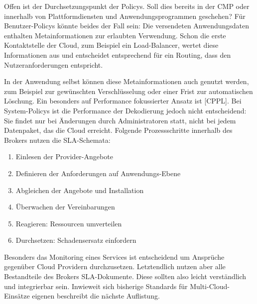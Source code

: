 Offen ist der Durchsetzungspunkt der Policys. Soll dies bereits in der CMP oder innerhalb von Plattformdiensten und Anwendungsprogrammen geschehen? Für Benutzer-Policys könnte beides der Fall sein: Die versendeten Anwendungsdaten enthalten Metainformationen zur erlaubten Verwendung. Schon die erste Kontaktstelle der Cloud, zum Beispiel ein Load-Balancer, wertet diese Informationen aus und entscheidet entsprechend für ein Routing, dass den Nutzeranforderungen entspricht. 

In der Anwendung selbst können diese Metainformationen auch genutzt werden, zum Beispiel zur gewünschten Verschlüsselung oder einer Frist zur automatischen Löschung. Ein besonders auf Performance fokussierter Ansatz ist [CPPL]. Bei System-Policys ist die Performance der Dekodierung jedoch nicht entscheidend: Sie findet nur bei Änderungen durch Administratoren statt, nicht bei jedem Datenpaket, das die Cloud erreicht. Folgende Prozessschritte innerhalb des Brokers nutzen die SLA-Schemata:

\begin{enumerate}
	\item Einlesen der Provider-Angebote
	\item Definieren der Anforderungen auf Anwendungs-Ebene
	\item Abgleichen der Angebote und Installation
	\item Überwachen der Vereinbarungen
	\item Reagieren: Ressourcen umverteilen
	\item Durchsetzen: Schadensersatz einfordern
\end{enumerate}

\noindent
Besonders das Monitoring eines Services ist entscheidend um Ansprüche gegenüber Cloud Providern durchzusetzen. Letztendlich nutzen aber alle Bestandteile des Brokers SLA-Dokumente. Diese sollten also leicht verständlich und integrierbar sein. Inwieweit sich bisherige Standards für Multi-Cloud-Einsätze eigenen beschreibt die nächste Auflistung.

